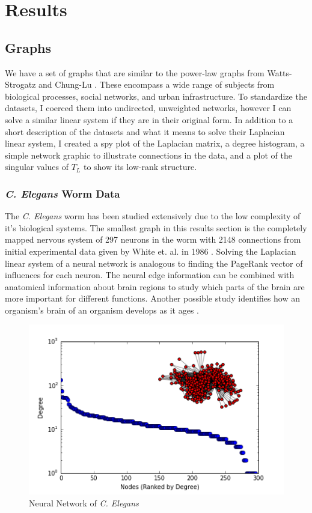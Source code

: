 \documentclass{article}
\begin{document}
\section{Results}
\subsection{Graphs}
We have a set of graphs that are similar to the power-law graphs from Watts-Strogatz and Chung-Lu \cite{Watts:1998,Chung:2004}. These encompass a wide range of subjects from biological processes, social networks, and urban infrastructure. To standardize the datasets, I coerced them into undirected, unweighted networks, however I can solve a similar linear system if they are in their original form. In addition to a short description of the datasets and what it means to solve their Laplacian linear system, I created a spy plot of the Laplacian matrix, a degree histogram, a simple network graphic to illustrate connections in the data, and a plot of the singular values of $T_L$ to show its low-rank structure.
\subsubsection{\textit{C. Elegans} Worm Data}
The \textit{C. Elegans} worm has been studied extensively due to the low complexity of it's biological systems. The smallest graph in this results section is the completely mapped nervous system of 297 neurons in the worm with 2148 connections from initial experimental data given by White et. al. in 1986 \cite{White:1986,Watts:1998}. Solving the Laplacian linear system of a neural network is analogous to finding the PageRank vector of  influences for each neuron. The neural edge information can be combined with anatomical information about brain regions to study which parts of the brain are more important for different functions. Another possible study identifies how an organism's brain of an organism develops as it ages \cite{Gleich:2015}.

\begin{figure}
\centering

\includegraphics[width=\linewidth]{neural_degree_histogram.png}
\caption{Neural Network of \textit{C. Elegans}}
  
\end{figure}
\end{document}
